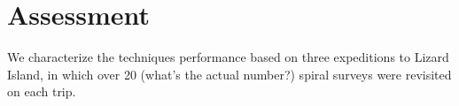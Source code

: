 \section{Assessment}

We characterize the techniques performance based on three expeditions to Lizard Island, in which over 20 (what's the actual number?) spiral surveys were revisited on each trip.
